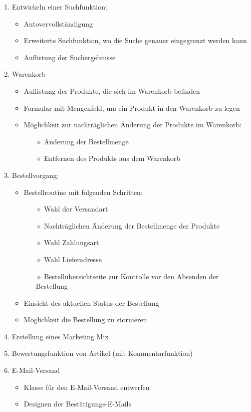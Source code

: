 \begin{enumerate}
\begin{itemize}
	\end{itemize}
	\item Entwickeln einer Suchfunktion:
	\begin{itemize}
		\item Autovervollständigung
		\item Erweiterte Suchfunktion, wo die Suche genauer eingegrenzt werden kann
		\item Auflistung der Suchergebnisse
	\end{itemize}
	\item Warenkorb
	\begin{itemize}
		\item Auflistung der Produkte, die sich im Warenkorb befinden
		\item Formular mit Mengenfeld, um ein Produkt in den Warenkorb zu legen
		\item Möglichkeit zur nachträglichen Änderung der Produkte im Warenkorb:
		\begin{itemize}
			\item[$\diamond$] Änderung der Bestellmenge
			\item[$\diamond$] Entfernen des Produkts aus dem Warenkorb
		\end{itemize}
	\end{itemize}
	\item Bestellvorgang:
	\begin{itemize}
		\item Bestellroutine mit folgenden Schritten:
		\begin{itemize}
			\item[$\diamond$] Wahl der Versandart
			\item[$\diamond$] Nachträglichen Änderung der Bestellmenge der Produkte
			\item[$\diamond$] Wahl Zahlungsart
			\item[$\diamond$] Wahl Lieferadresse
			\item[$\diamond$] Bestellübersichtseite zur Kontrolle vor den Absenden der Bestellung
		\end{itemize}
		\item Einsicht des aktuellen Status der Bestellung
		\item Möglichkeit die Bestellung zu stornieren
	\end{itemize}
	
	\item Erstellung eines Marketing Mix
	\item Bewertungsfunktion von Artikel (mit Kommentarfunktion)
	\item E-Mail-Versand
	\begin{itemize}
		\item Klasse für den E-Mail-Versand entwerfen
		\item Designen der Bestätigungs-E-Mails
	\end{itemize}					 
\end{enumerate}

